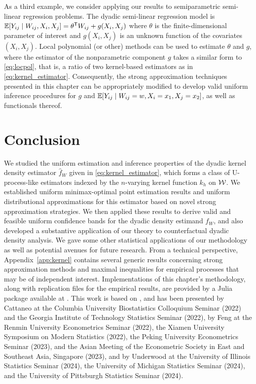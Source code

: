 As a third example, we consider applying our results to semiparametric
semi-linear regression problems. The dyadic semi-linear regression model is
$\mathbb{E}[Y_{i j} \mid W_{i j}, X_i, X_j] = \theta^{\mathsf{T}} W_{i j} + g(X_i, X_j)$
where $\theta$ is the finite-dimensional parameter of interest
and $g(X_i, X_j)$ is an unknown function of the covariates $(X_i, X_j)$.
Local polynomial (or other) methods can be used to estimate $\theta$ and $g$,
where the estimator of the nonparametric component $g$ takes a similar form to
\eqref{eq:locpol}, that is, a ratio of two kernel-based estimators as in
\eqref{eq:kernel_estimator}. Consequently, the strong approximation techniques
presented in this chapter can be appropriately modified to develop valid
uniform inference procedures for $g$ and
$\mathbb{E}[Y_{i j} \mid W_{i j}=w, X_i=x_1, X_j=x_2]$, as well as functionals thereof.

\section{Conclusion}
\label{sec:conclusion}

We studied the uniform estimation and inference properties of the dyadic kernel
density estimator $\hat{f}_W$ given in \eqref{eq:kernel_estimator}, which forms
a class of U-process-like estimators indexed by the $n$-varying kernel function
$k_h$ on $\mathcal{W}$. We established uniform minimax-optimal point estimation results
and uniform distributional approximations for this estimator based on novel
strong approximation strategies. We then applied these results to derive valid
and feasible uniform confidence bands for the dyadic density estimand $f_W$,
and also developed a substantive application of our theory to counterfactual
dyadic density analysis. We gave some other statistical applications of our
methodology as well as potential avenues for future research. From a technical
perspective, Appendix~\ref{app:kernel} contains several generic results
concerning strong approximation methods and maximal inequalities for empirical
processes that may be of independent interest. Implementations of this
chapter's methodology, along with replication files for the empirical results,
are provided by a Julia package available at
.
This work is based on \citet{cattaneo2024uniform},
and has been presented by Cattaneo at
the Columbia University Biostatistics Colloquium Seminar (2022)
and the Georgia Institute of Technology Statistics Seminar (2022),
by Feng at
the Renmin University Econometrics Seminar (2022),
the Xiamen University Symposium on Modern Statistics (2022),
the Peking University Econometrics Seminar (2023),
and the Asian Meeting of the Econometric Society
in East and Southeast Asia, Singapore (2023),
and by Underwood at the University of Illinois Statistics Seminar (2024),
the University of Michigan Statistics Seminar (2024), and the University of
Pittsburgh Statistics Seminar (2024).
